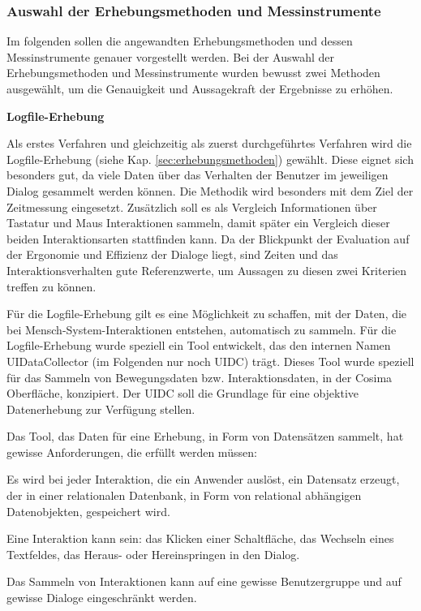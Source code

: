 
\subsubsection{Auswahl der Erhebungsmethoden und Messinstrumente}
Im folgenden sollen die angewandten Erhebungsmethoden und dessen Messinstrumente genauer vorgestellt werden. Bei der Auswahl der Erhebungsmethoden und Messinstrumente wurden bewusst zwei Methoden ausgewählt, um die Genauigkeit und Aussagekraft der Ergebnisse zu erhöhen.

\textbf{Logfile-Erhebung}

Als erstes Verfahren und gleichzeitig als zuerst durchgeführtes Verfahren wird die Logfile-Erhebung (siehe Kap. \ref{sec:erhebungsmethoden}) gewählt. Diese eignet sich besonders gut, da viele Daten über das Verhalten der Benutzer im jeweiligen Dialog gesammelt werden können. Die Methodik wird besonders mit dem Ziel der Zeitmessung eingesetzt. Zusätzlich soll es als Vergleich Informationen über Tastatur und Maus Interaktionen sammeln, damit später ein Vergleich dieser beiden Interaktionsarten stattfinden kann. Da der Blickpunkt der Evaluation auf der Ergonomie und Effizienz der Dialoge liegt, sind Zeiten und das Interaktionsverhalten gute Referenzwerte, um Aussagen zu diesen zwei Kriterien treffen zu können.

Für die Logfile-Erhebung gilt es eine Möglichkeit zu schaffen, mit der Daten, die bei Mensch-System-Interaktionen entstehen, automatisch zu sammeln. Für die Logfile-Erhebung wurde speziell ein Tool entwickelt, das den internen Namen UIDataCollector (im Folgenden nur noch UIDC) trägt. Dieses Tool wurde speziell für das Sammeln von Bewegungsdaten bzw. Interaktionsdaten, in der Cosima Oberfläche, konzipiert. Der UIDC soll die Grundlage für eine objektive Datenerhebung zur Verfügung stellen.

Das Tool, das Daten für eine Erhebung, in Form von Datensätzen sammelt, hat gewisse Anforderungen, die erfüllt werden müssen:
\begin{compactitem}
   \item Es wird bei jeder Interaktion, die ein Anwender auslöst, ein Datensatz erzeugt, der in einer relationalen Datenbank, in Form von relational abhängigen Datenobjekten, gespeichert wird.
   \item Eine Interaktion kann sein: das Klicken einer Schaltfläche, das Wechseln eines Textfeldes, das Heraus- oder Hereinspringen in den Dialog.
   \item Das Sammeln von Interaktionen kann auf eine gewisse Benutzergruppe und auf gewisse Dialoge eingeschränkt werden.
\end{compactitem}

